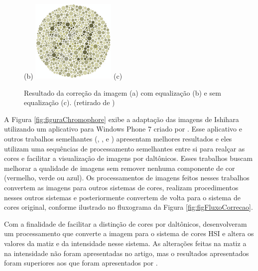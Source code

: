 \documentclass[	12pt, Times, openright, twoside, a4paper, english, brazil]{abntex2}
\begin{document}
\begin{figure}[!htb]
(b)
\endminipage\hfill
{}
\centering
{\includegraphics[width=\linewidth]{jleesemequalizacao.png}}
(c)
\endminipage\hfill
\caption{Resultado da correção da imagem (a) com equalização (b) e sem equalização (c). (retirado de )}
\label{fig:resultadosjlee}
\end{figure}


A Figura \ref{fig:figuraChromophore} exibe a adaptação das imagens de Ishihara utilizando um aplicativo para Windows Phone 7 criado por . Esse aplicativo e outros trabalhos semelhantes (, ,  e ) apresentam melhores resultados e eles utilizam uma sequências de processamento semelhantes entre si para realçar as cores e facilitar a visualização de imagens por daltônicos. Esses trabalhos buscam melhorar a qualidade de imagens sem remover nenhuma componente de cor (vermelho, verde ou azul). Os processamentos de imagens feitos nesses trabalhos convertem as imagens para outros sistemas de cores, realizam procedimentos nesses outros sistemas e posteriormente convertem de volta para o sistema de cores original, conforme ilustrado no fluxograma da Figura \ref{fig:figFluxoCorrecao}.

Com a finalidade de facilitar a distinção de cores por daltônicos,  desenvolveram um processamento que converte a imagem para o sistema de cores HSI e altera os valores da matiz e da intensidade nesse sistema. As alterações feitas na matiz a na intensidade não foram apresentadas no artigo, mas o resultados apresentados foram superiores aos que foram apresentados por .
\end{document}
